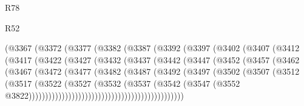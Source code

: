 \begin{lexlean}{R78}
\begin{lexlean}{R52}
\begin{coremodule}
{{{{{{{{{{{{{{{{{{{{{{{{{{{{{{{{{{{{{{{{{{{{{{{{{{{{{{{{{{{{{{{{{{{{{{{{{{{{{{{{{{{{{{{{{{{{{{{{{{{{{{{{{{{{{{{{{{{{{{{{{{{{{{{{{{{{{{{{{{{{{{{{{{{{{{{{{{{{{{{{{{{{{{{{{{{{{{{{{{{{{{{{{{{{{{{{{{{{{{                      (@3367
                        (@3372
                          (@3377
                            (@3382
                              (@3387
                                (@3392
                                  (@3397
                                    (@3402
                                      (@3407
                                        (@3412
                                          (@3417
                                            (@3422
                                              (@3427
                                                (@3432
                                                  (@3437
                                                    (@3442
                                                      (@3447
                                                        (@3452
                                                          (@3457
                                                            (@3462
                                                              (@3467
                                                                (@3472
                                                                  (@3477
                                                                    (@3482
                                                                      (@3487
                                                                        (@3492
                                                                          (@3497
                                                                            (@3502
                                                                              (@3507
                                                                                (@3512
                                                                                  (@3517
                                                                                    (@3522
                                                                                      (@3527
                                                                                        (@3532
                                                                                          (@3537
                                                                                            (@3542
                                                                                              (@3547
                                                                                                (@3552
                                                                                                  @3822)))))))))))))))))))))))))))))))))))))))))))))))
}}}}}}}}}}}}}}}}}}}}}}}}}}}}}}}}}}}}}}}}}}}}}}}}}}}}}}}}}}}}}}}}}}}}}}}}}}}}}}}}}}}}}}}}}}}}}}}}}}}}}}}}}}}}}}}}}}}}}}}}}}}}}}}}}}}}}}}}}}}}}}}}}}}}}}}}}}}}}}}}}}}}}}}}}}}}}}}}}}}}}}}}}}}}}}}}}}}}}}
\end{coremodule}
\end{lexlean}
\end{lexlean}
